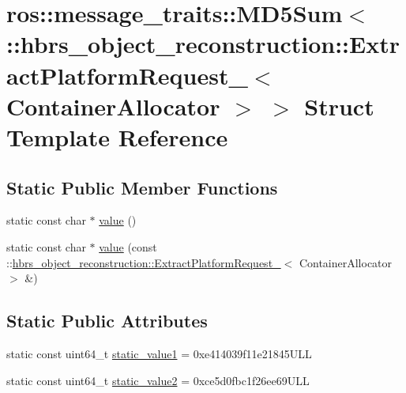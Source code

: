 \hypertarget{structros_1_1message__traits_1_1_m_d5_sum_3_01_1_1hbrs__object__reconstruction_1_1_extract_platfd3ec68e33119d9e966e559be7b50877c}{\section{ros\-:\-:message\-\_\-traits\-:\-:\-M\-D5\-Sum$<$ \-:\-:hbrs\-\_\-object\-\_\-reconstruction\-:\-:\-Extract\-Platform\-Request\-\_\-$<$ \-Container\-Allocator $>$ $>$ \-Struct \-Template \-Reference}
\label{structros_1_1message__traits_1_1_m_d5_sum_3_01_1_1hbrs__object__reconstruction_1_1_extract_platfd3ec68e33119d9e966e559be7b50877c}
}
\subsection*{\-Static \-Public \-Member \-Functions}
\begin{DoxyCompactItemize}
\item 
static const char $\ast$ \hyperlink{structros_1_1message__traits_1_1_m_d5_sum_3_01_1_1hbrs__object__reconstruction_1_1_extract_platfd3ec68e33119d9e966e559be7b50877c_a5eda43bcac80f7b6d580cc462713b29c}{value} ()
\item 
static const char $\ast$ \hyperlink{structros_1_1message__traits_1_1_m_d5_sum_3_01_1_1hbrs__object__reconstruction_1_1_extract_platfd3ec68e33119d9e966e559be7b50877c_a5093cd0f230fad4e233b1649ec6cb923}{value} (const \-::\hyperlink{structhbrs__object__reconstruction_1_1_extract_platform_request__}{hbrs\-\_\-object\-\_\-reconstruction\-::\-Extract\-Platform\-Request\-\_\-}$<$ \-Container\-Allocator $>$ \&)
\end{DoxyCompactItemize}
\subsection*{\-Static \-Public \-Attributes}
\begin{DoxyCompactItemize}
\item 
static const uint64\-\_\-t \hyperlink{structros_1_1message__traits_1_1_m_d5_sum_3_01_1_1hbrs__object__reconstruction_1_1_extract_platfd3ec68e33119d9e966e559be7b50877c_a63c580d5c8c19e05c5538153d013a798}{static\-\_\-value1} = 0xe414039f11e21845\-U\-L\-L
\item 
static const uint64\-\_\-t \hyperlink{structros_1_1message__traits_1_1_m_d5_sum_3_01_1_1hbrs__object__reconstruction_1_1_extract_platfd3ec68e33119d9e966e559be7b50877c_a7372f53ba7af6f1d65d178cf79b68554}{static\-\_\-value2} = 0xce5d0fbc1f26ee69\-U\-L\-L
\end{DoxyCompactItemize}
